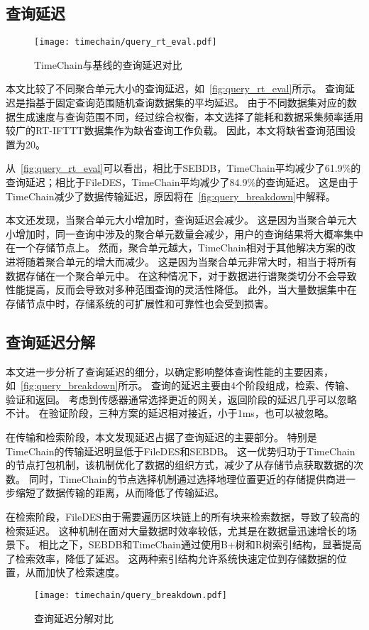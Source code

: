 \subsection{查询延迟}
\begin{figure}[t]
    \centering
    \texttt{[image: timechain/query\_rt\_eval.pdf]}
    \caption{TimeChain与基线的查询延迟对比}
    \label{fig:query_rt_eval}
\end{figure}
本文比较了不同聚合单元大小的查询延迟，如~\autoref{fig:query_rt_eval}所示。
查询延迟是指基于固定查询范围随机查询数据集的平均延迟。
由于不同数据集对应的数据生成速度与查询范围不同，经过综合权衡，本文选择了能耗和数据采集频率适用较广的RT-IFTTT数据集作为缺省查询工作负载。
因此，本文将缺省查询范围设置为20。

从~\autoref{fig:query_rt_eval}可以看出，相比于SEBDB，TimeChain平均减少了61.9\%的查询延迟；相比于FileDES，TimeChain平均减少了84.9\%的查询延迟。
这是由于TimeChain减少了数据传输延迟，原因将在~\autoref{fig:query_breakdown}中解释。

本文还发现，当聚合单元大小增加时，查询延迟会减少。
这是因为当聚合单元大小增加时，同一查询中涉及的聚合单元数量会减少，用户的查询结果将大概率集中在一个存储节点上。
然而，聚合单元越大，TimeChain相对于其他解决方案的改进将随着聚合单元的增大而减少。
这是因为当聚合单元非常大时，相当于将所有数据存储在一个聚合单元中。
在这种情况下，对于数据进行谱聚类切分不会导致性能提高，反而会导致对多种范围查询的灵活性降低。
此外，当大量数据集中在存储节点中时，存储系统的可扩展性和可靠性也会受到损害。

\subsection{查询延迟分解}
本文进一步分析了查询延迟的细分，以确定影响整体查询性能的主要因素，如~\autoref{fig:query_breakdown}所示。
查询的延迟主要由4个阶段组成，检索、传输、验证和返回。
考虑到传感器通常选择更近的网关，返回阶段的延迟几乎可以忽略不计。
在验证阶段，三种方案的延迟相对接近，小于1ms，也可以被忽略。

在传输和检索阶段，本文发现延迟占据了查询延迟的主要部分。
特别是TimeChain的传输延迟明显低于FileDES和SEBDB。
这一优势归功于TimeChain的节点打包机制，该机制优化了数据的组织方式，减少了从存储节点获取数据的次数。
同时，TimeChain的节点选择机制通过选择地理位置更近的存储提供商进一步缩短了数据传输的距离，从而降低了传输延迟。

在检索阶段，FileDES由于需要遍历区块链上的所有块来检索数据，导致了较高的检索延迟。
这种机制在面对大量数据时效率较低，尤其是在数据量迅速增长的场景下。
相比之下，SEBDB和TimeChain通过使用B+树和R树索引结构，显著提高了检索效率，降低了延迟。
这两种索引结构允许系统快速定位到存储数据的位置，从而加快了检索速度。
\begin{figure}[t]
    \centering
    \texttt{[image: timechain/query\_breakdown.pdf]}
    \caption{查询延迟分解对比}
    \label{fig:query_breakdown}
\end{figure}

